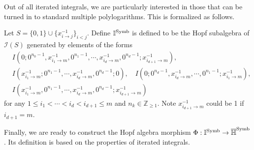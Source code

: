 

Out of all iterated integrals, we are particularly interested in those that can be turned in to standard multiple polylogarithms. This is formalized as follows.

\begin{definition}\label{def: ISymb}
Let $S=\{0,1\}\cup\{x_{i\to j}^{-1}\}_{i<j}$. Define $\mathbb I^{\operatorname{Symb}}$ is defined to be the Hopf subalgebra of $\mathcal I(S)$ generated by elements of the forms
\begin{align*}
&I(0;0^{n_0-1},x_{i_1\to m}^{-1},0^{n_1-1},\cdots,x_{i_d\to m}^{-1},0^{n_d-1};x_{i_{d+1}\to m}^{-1}),\\
&I(x_{i_1\to m}^{-1};0^{n_1-1},\cdots,x_{i_d\to m}^{-1},0^{n_d-1};0),\quad I(0;0^{n_d-1},x_{i_d\to m}^{-1},\cdots,0^{n_1-1};x_{i_1\to m}^{-1}),\\
&I(x_{i_1\to m}^{-1},0^{n_1-1},\cdots,x_{i_d\to m}^{-1},0^{n_d-1};x_{i_{d+1}\to m}^{-1})
\end{align*}
for any $1\leq i_1<\cdots<i_d< i_{d+1}\leq m$ and $n_k\in\mathbb Z_{\geq1}$. Note $x_{i_{d+1}\to m}^{-1}$ could be 1 if $i_{d+1}=m$.
\end{definition}

Finally, we are ready to construct the Hopf algebra morphism $\Phi:\mathbb I^{\operatorname{Symb}}\to\overline{\mathbb H}^{\operatorname{Symb}}$. Its definition is based on the properties of iterated integrals.

